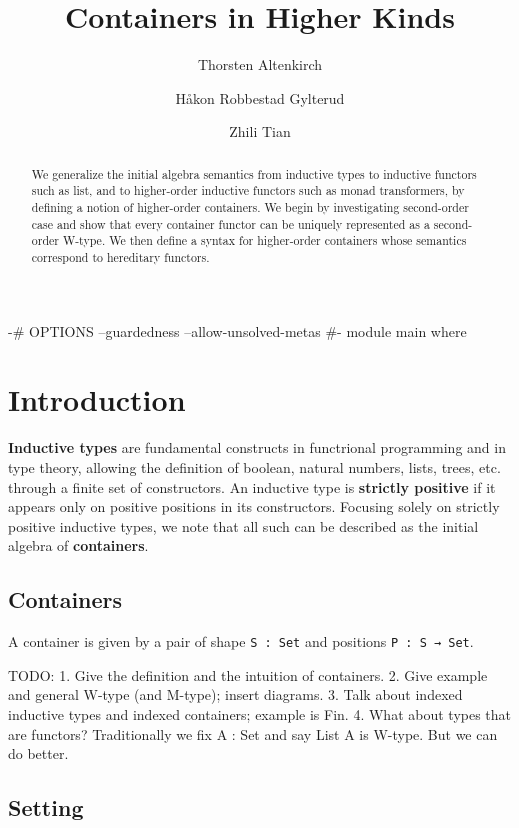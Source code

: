 \documentclass{easychair}
\title{Containers in Higher Kinds}
\author{
  Thorsten Altenkirch\inst{1} \and
  H{\aa}kon Robbestad Gylterud\inst{2} \and
  Zhili Tian\inst{1}
}
\institute{
  $^{1}$School of Computer Science, University of Nottingham\\
  \email{\{psztxa,psxzt8\}@nottingham.ac.uk}\\
  $^{2}$Department of Informatics, University of Bergen\\
  \email{hakon.gylterud@uib.no}
}
\begin{document}
\maketitle

\begin{abstract}
We generalize the initial algebra semantics from inductive types to inductive 
functors such as list, and to higher-order inductive functors such as monad 
transformers, by defining a notion of higher-order containers. We begin by 
investigating second-order case and show that every container functor can 
be uniquely represented as a second-order W-type. We then define a syntax for
higher-order containers whose semantics correspond to hereditary functors.
\end{abstract}

\begin{code}[hide]
{-# OPTIONS --guardedness --allow-unsolved-metas #-}
module main where
\end{code}

\section{Introduction}

\textbf{Inductive types} are fundamental constructs in functrional programming 
and in type theory, allowing the definition of boolean, natural numbers, lists,
trees, etc. through a finite set of constructors. An inductive type is 
\textbf{strictly positive} if it appears only on positive positions in its 
constructors. Focusing solely on strictly positive inductive types, we note that 
all such can be described as the initial algebra of \textbf{containers}.

\subsection{Containers}

A container is given by a pair of shape \texttt{S : Set} and positions 
\texttt{P : S → Set}.

TODO: 
1. Give the definition and the intuition of containers.
2. Give example and general W-type (and M-type); insert diagrams.
3. Talk about indexed inductive types and indexed containers; example is Fin. 
4. What about types that are functors? Traditionally we fix A : Set and say
List A is W-type. But we can do better.

\subsection{Setting}
\end{document}
